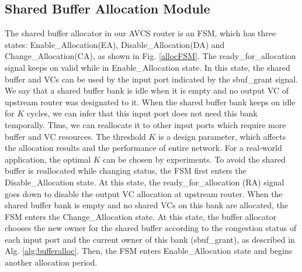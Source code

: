 \documentclass[10pt,conference]{IEEEtran}
\begin{document}
\subsection{Shared Buffer Allocation Module}\label{bufmanage}
The shared buffer allocator in our AVCS router is an FSM, which has three states: Enable\_Allocation(EA), Disable\_Allocation(DA) and Change\_Allocation(CA), as shown in Fig. \ref{allocFSM}. The ready\_for\_allocation signal keeps on valid while in Enable\_Allocation state. In this state, the shared buffer and VCs can be used by the input port indicated by the sbuf\_grant signal. We say that a shared buffer bank is idle when it is empty and no output VC of upstream router was designated to it. When the shared buffer bank keeps on idle for $K$ cycles, we can infer that this input port does not need this bank temporally. Thus, we can reallocate it to other input ports which require more buffer and VC resources. The threshold $K$ is a design parameter, which affects the allocation results and the performance of entire network. For a real-world application, the optimal $K$ can be chosen by experiments. To avoid the shared buffer is reallocated while changing status, the FSM first enters the Disable\_Allocation state. At this state, the ready\_for\_allocation (RA) signal goes down to disable the output VC allocation at upstream router. When the shared buffer bank is empty and no shared VCs on this bank are allocated, the FSM enters the Change\_Allocation state. At this state, the buffer allocator chooses the new owner for the shared buffer according to the congestion status of each input port and the current owner of this bank (sbuf\_grant), as described in Alg. \ref{alg:bufferalloc}. Then, the FSM enters Enable\_Allocation state and begins another allocation period.

\end{document}
